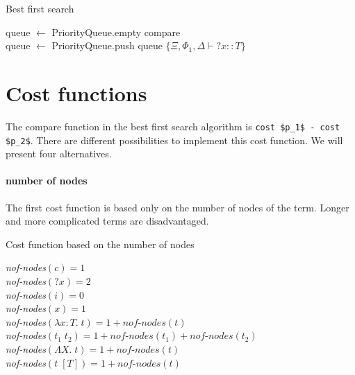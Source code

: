 \begin{algorithm}
\caption{Best first search}

queue $\gets$ PriorityQueue.empty {\color{blue}compare}\\
queue $\gets$ PriorityQueue.push queue $\{\Xi, \Phi_1, \Delta \vdash {?x} :: T\}$\\

\end{algorithm}

\section{Cost functions}\label{Cost functions}
The compare function in the best first search algorithm is \lstinline?cost $p_1$ - cost $p_2$?. There are different possibilities to implement this cost function. We will present four alternatives.

  \paragraph{number of nodes}
The first cost function is based only on the number of nodes of the term. Longer and more complicated terms are disadvantaged.
%
\begin{algorithm}
\caption{Cost function based on the number of nodes}

\textit{nof-nodes}$(c) = 1$\\
\textit{nof-nodes}$({?x}) = 2$\\
\textit{nof-nodes}$(i) = 0$\\
\textit{nof-nodes}$(x) = 1$\\
\textit{nof-nodes}$(\lambda x : T.\; t) = 1 + \textit{nof-nodes}(t)$\\
\textit{nof-nodes}$(t_1\; t_2) = 1 + \textit{nof-nodes}(t_1) + \textit{nof-nodes}(t_2)$\\
\textit{nof-nodes}$(\Lambda X.\; t) = 1 + \textit{nof-nodes}(t)$\\
\textit{nof-nodes}$(t\; [T]) = 1 + \textit{nof-nodes}(t)$\\

\end{algorithm} 
%
